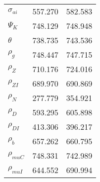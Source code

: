 \begin{center}
\begin{longtable}{lcc}
$ {\sigma_{ai}}        $	 & 	     557.270	 & 	     582.583 \\ 
$ {\Psi_{K}}           $	 & 	     748.129	 & 	     748.948 \\ 
$ {\theta}             $	 & 	     738.735	 & 	     743.536 \\ 
$ {\rho_g}             $	 & 	     748.447	 & 	     747.715 \\ 
$ {\rho_Z}             $	 & 	     710.176	 & 	     724.016 \\ 
$ {\rho_{ZI}}          $	 & 	     689.970	 & 	     690.869 \\ 
$ {\rho_N}             $	 & 	     277.779	 & 	     354.921 \\ 
$ {\rho_D}             $	 & 	     593.295	 & 	     605.898 \\ 
$ {\rho_{DI}}          $	 & 	     413.306	 & 	     396.217 \\ 
$ {\rho_b}             $	 & 	     657.262	 & 	     660.795 \\ 
$ {\rho_{muC}}         $	 & 	     748.331	 & 	     742.989 \\ 
$ {\rho_{muI}}         $	 & 	     644.552	 & 	     690.994 \\ 
\end{longtable}
 \end{center}
